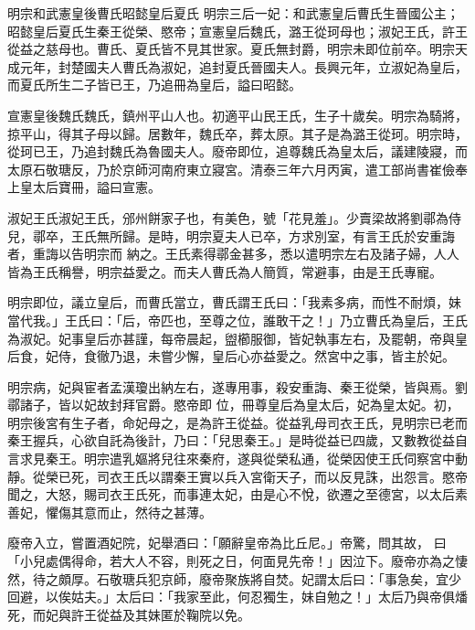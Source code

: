 
\begin{pinyinscope}

 明宗和武憲皇後曹氏昭懿皇后夏氏
 明宗三后一妃：和武憲皇后曹氏生晉國公主；昭懿皇后夏氏生秦王從榮、愍帝；宣憲皇后魏氏，潞王從珂母也；淑妃王氏，許王從益之慈母也。曹氏、夏氏皆不見其世家。夏氏無封爵，明宗未即位前卒。明宗天成元年，封楚國夫人曹氏為淑妃，追封夏氏晉國夫人。長興元年，立淑妃為皇后，而夏氏所生二子皆已王，乃追冊為皇后，謚曰昭懿。



 宣憲皇後魏氏魏氏，鎮州平山人也。初適平山民王氏，生子十歲矣。明宗為騎將，掠平山，得其子母以歸。居數年，魏氏卒，葬太原。其子是為潞王從珂。明宗時，從珂已王，乃追封魏氏為魯國夫人。廢帝即位，追尊魏氏為皇太后，議建陵寢，而太原石敬瑭反，乃於京師河南府東立寢宮。清泰三年六月丙寅，遣工部尚書崔儉奉上皇太后寶冊，謚曰宣憲。



 淑妃王氏淑妃王氏，邠州餅家子也，有美色，號「花見羞」。少賣梁故將劉鄩為侍兒，鄩卒，王氏無所歸。是時，明宗夏夫人已卒，方求別室，有言王氏於安重誨者，重誨以告明宗而
 納之。王氏素得鄩金甚多，悉以遣明宗左右及諸子婦，人人皆為王氏稱譽，明宗益愛之。而夫人曹氏為人簡質，常避事，由是王氏專寵。



 明宗即位，議立皇后，而曹氏當立，曹氏謂王氏曰：「我素多病，而性不耐煩，妹當代我。」王氏曰：「后，帝匹也，至尊之位，誰敢干之！」乃立曹氏為皇后，王氏為淑妃。妃事皇后亦甚謹，每帝晨起，盥櫛服御，皆妃執事左右，及罷朝，帝與皇后食，妃侍，食徹乃退，未嘗少懈，皇后心亦益愛之。然宮中之事，皆主於妃。



 明宗病，妃與宦者孟漢瓊出納左右，遂專用事，殺安重誨、秦王從榮，皆與焉。劉鄩諸子，皆以妃故封拜官爵。愍帝即
 位，冊尊皇后為皇太后，妃為皇太妃。初，明宗後宮有生子者，命妃母之，是為許王從益。從益乳母司衣王氏，見明宗已老而秦王握兵，心欲自託為後計，乃曰：「兒思秦王。」是時從益已四歲，又數教從益自言求見秦王。明宗遣乳嫗將兒往來秦府，遂與從榮私通，從榮因使王氏伺察宮中動靜。從榮已死，司衣王氏以謂秦王實以兵入宮衛天子，而以反見誅，出怨言。愍帝聞之，大怒，賜司衣王氏死，而事連太妃，由是心不悅，欲遷之至德宮，以太后素善妃，懼傷其意而止，然待之甚薄。



 廢帝入立，嘗置酒妃院，妃舉酒曰：「願辭皇帝為比丘尼。」帝驚，問其故，
 曰「小兒處偶得命，若大人不容，則死之日，何面見先帝！」因泣下。廢帝亦為之悽然，待之頗厚。石敬瑭兵犯京師，廢帝聚族將自焚。妃謂太后曰：「事急矣，宜少回避，以俟姑夫。」太后曰：「我家至此，何忍獨生，妹自勉之！」太后乃與帝俱燔死，而妃與許王從益及其妹匿於鞠院以免。




\end{pinyinscope}
